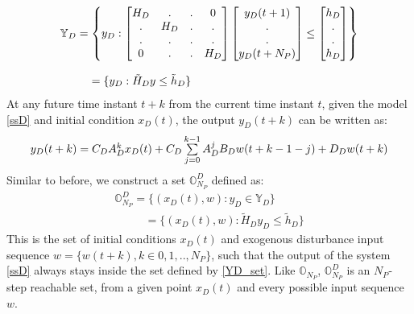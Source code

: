 \documentclass[letterpaper, 10 pt, conference]{ieeeconf}  %
\begin{document}
 \begin{equation}
 \small
 \begin{matrix}
 \mathbb{Y}_D=\begin{Bmatrix}y_D:
 \begin{bmatrix}
 H_D & . & . & 0 \\
 . & H_D & . & .\\
 . & . & . & . \\
 0 & . & . & H_D
 \end{bmatrix}
 \begin{bmatrix}
 y_D(t+1) \\ . \\ . \\ y_D(t+N_P)
 \end{bmatrix}
 \leq \begin{bmatrix}
 h_D \\ . \\ . \\  h_D
 \end{bmatrix}
 \end{Bmatrix} 
 \\ \\
 \hspace{-120pt}
 = 
 \{ y_D: \tilde{H}_D y \leq \tilde{h}_D \}
 \end{matrix}
 \label{YD_set}
 \end{equation} 
At any future time instant $t+k$ from the current time instant $t$, given the model \eqref{ssD} and initial condition $x_D(t)$, the output $y_D(t+k)$ can be written as:
\begin{equation}
\small
\begin{matrix}
y_D(t+k)=C_DA_D^{k}x_D(t)+ C_D\sum\limits_{j=0}^{k-1}A_D^jB_Dw(t+k-1-j)+D_Dw(t+k) \\
\end{matrix}
\label{expanded_xD}
\end{equation}
Similar to before, we construct a set $\mathbb{O}^D_{N_P}$ defined as:
  \begin{equation}
  \begin{matrix}
  \mathbb{O}^D_{N_P} = \{(x_D(t),w):y_D\in \mathbb{Y}_D\}  \\
    \hspace{32pt} = \{(x_D(t),w):\tilde{H}_Dy_D \leq \tilde{h}_D\} 
  \end{matrix}
  \label{O_D_form}
  \end{equation}
  This is the set of initial conditions $x_D(t)$ and exogenous disturbance input sequence $w=\{w(t+k),k \in 0, 1, .., N_P\}$, such that the output of the system \eqref{ssD} always stays inside the set defined by \eqref{YD_set}. Like $\mathbb{O}_{N_P}$, $\mathbb{O}_{N_P}^D$ is an $N_P$-step reachable set, from a given point $x_D(t)$ and every possible input sequence $w$.
\end{document}
